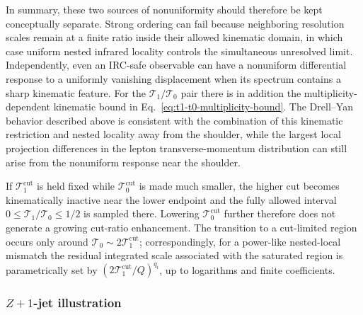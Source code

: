 \documentclass[11pt]{article}
\newcommand{\cut}{\mathrm{cut}}
\begin{document}
In summary, these two sources of nonuniformity should therefore be kept conceptually separate. Strong ordering can fail
because neighboring resolution scales remain at a finite ratio inside their allowed kinematic domain, in
which case uniform nested infrared locality controls the simultaneous unresolved limit. Independently, even
an IRC-safe observable can have a nonuniform differential response to a uniformly vanishing displacement when
its spectrum contains a sharp kinematic feature. For the \(\mathcal T_1/\mathcal T_0\) pair there is in
addition the multiplicity-dependent kinematic bound in Eq.~\eqref{eq:t1-t0-multiplicity-bound}. The
Drell--Yan behavior described above is consistent with the combination of this kinematic restriction and
nested locality away from the shoulder, while the largest local projection differences in the lepton
transverse-momentum distribution can still arise from the nonuniform response near the shoulder.

If \(\mathcal T_1^{\cut}\) is held fixed while \(\mathcal T_0^{\cut}\) is made much smaller, the higher cut
becomes kinematically inactive near the lower endpoint and the fully allowed interval
\(0\le\mathcal T_1/\mathcal T_0\le1/2\) is sampled there. Lowering \(\mathcal T_0^{\cut}\) further therefore
does not generate a growing cut-ratio enhancement. The transition to a cut-limited region occurs only around
\(\mathcal T_0\sim2\mathcal T_1^{\cut}\); correspondingly, for a power-like nested-local mismatch the
residual integrated scale associated with the saturated region is parametrically set by
\((2\mathcal T_1^{\cut}/Q)^{q_i}\), up to logarithms and finite coefficients.

\subsubsection{\texorpdfstring{$Z+1$-jet}{Z+1-jet} illustration}
\label{subsubsec:z1jet-illustration}
\end{document}
